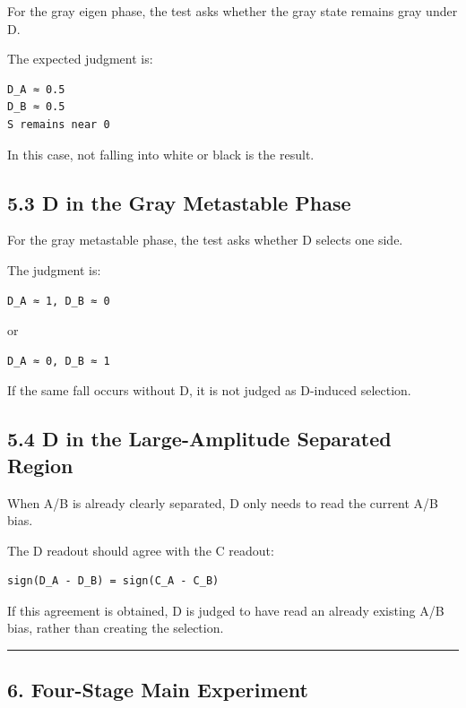 \documentclass{article}
\begin{document}
For the gray eigen phase, the test asks whether the gray state remains
gray under D.

The expected judgment is:

\begin{verbatim}
D_A ≈ 0.5
D_B ≈ 0.5
S remains near 0
\end{verbatim}

In this case, not falling into white or black is the result.

\subsection{5.3 D in the Gray Metastable
Phase}\label{d-in-the-gray-metastable-phase}

For the gray metastable phase, the test asks whether D selects one side.

The judgment is:

\begin{verbatim}
D_A ≈ 1, D_B ≈ 0
\end{verbatim}

or

\begin{verbatim}
D_A ≈ 0, D_B ≈ 1
\end{verbatim}

If the same fall occurs without D, it is not judged as D-induced
selection.

\subsection{5.4 D in the Large-Amplitude Separated
Region}\label{d-in-the-large-amplitude-separated-region}

When A/B is already clearly separated, D only needs to read the current
A/B bias.

The D readout should agree with the C readout:

\begin{verbatim}
sign(D_A - D_B) = sign(C_A - C_B)
\end{verbatim}

If this agreement is obtained, D is judged to have read an already
existing A/B bias, rather than creating the selection.

\begin{center}\rule{0.5\linewidth}{0.5pt}\end{center}

\subsection{6. Four-Stage Main
Experiment}\label{four-stage-main-experiment}
\end{document}
